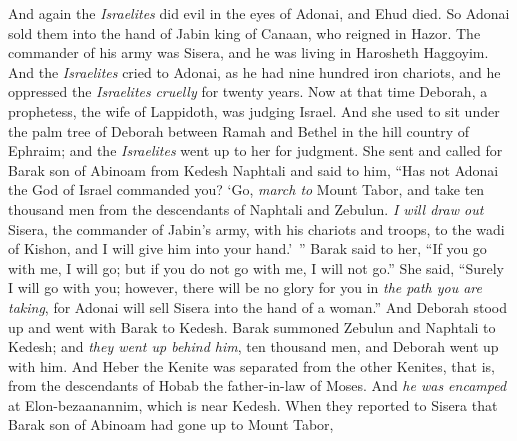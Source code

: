 \begin{biblechapter} %
 And again the \textit{Israelites} did evil in the eyes of Adonai, and Ehud died.
\verse So Adonai sold them into the hand of Jabin king of Canaan, who reigned in Hazor. The commander of his army was Sisera, and he was living in Harosheth Haggoyim.
\verse And the \textit{Israelites} cried to Adonai, as he had nine hundred iron chariots, and he oppressed the \textit{Israelites} \textit{cruelly} for twenty years.
\verse Now at that time Deborah, a prophetess, the wife of Lappidoth, was judging Israel.
\verse And she used to sit under the palm tree of Deborah between Ramah and Bethel in the hill country of Ephraim; and the \textit{Israelites} went up to her for judgment.
\verse She sent and called for Barak son of Abinoam from Kedesh Naphtali and said to him, “Has not Adonai the God of Israel commanded you? ‘Go, \textit{march to} Mount Tabor, and take ten thousand men from the descendants of Naphtali and Zebulun.
\verse \textit{I will draw out} Sisera, the commander of Jabin’s army, with his chariots and troops, to the wadi of Kishon, and I will give him into your hand.’ ”
\verse Barak said to her, “If you go with me, I will go; but if you do not go with me, I will not go.”
\verse She said, “Surely I will go with you; however, there will be no glory for you in \textit{the path you are taking}, for Adonai will sell Sisera into the hand of a woman.” And Deborah stood up and went with Barak to Kedesh.
\verse Barak summoned Zebulun and Naphtali to Kedesh; and \textit{they went up behind him}, ten thousand men, and Deborah went up with him.
\verse And Heber the Kenite was separated from the other Kenites, that is, from the descendants of Hobab the father-in-law of Moses. And \textit{he was encamped} at Elon-bezaanannim, which is near Kedesh.
\verse When they reported to Sisera that Barak son of Abinoam had gone up to Mount Tabor,

\end{biblechapter}
